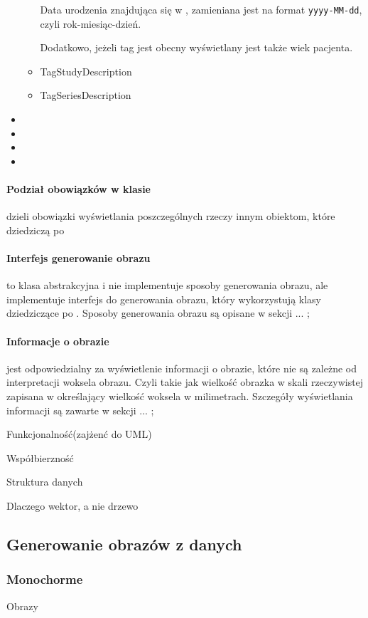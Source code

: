 \begin{itemize}
\begin{itemize}
        Data urodzenia znajdująca się w , zamieniana jest na format \texttt{yyyy-MM-dd}, czyli rok-miesiąc-dzień.

        Dodatkowo, jeżeli tag jest  obecny wyświetlany jest także wiek pacjenta.

        \item TagStudyDescription
        \item TagSeriesDescription
    \end{itemize}

    \item {}
    \item {}
    \item {}
    \item {}
\end{itemize}

\paragraph{Podział obowiązków w klasie}
 dzieli obowiązki wyświetlania poszczególnych rzeczy innym obiektom, które dziedziczą po \sokarclass

\paragraph{Interfejs generowanie obrazu}
 to klasa abstrakcyjna i nie implementuje sposoby generowania obrazu, ale implementuje interfejs do generowania obrazu, który wykorzystują klasy dziedziczące po .
Sposoby generowania obrazu są opisane w sekcji ... ;

\paragraph{Informacje o obrazie}
 jest odpowiedzialny za wyświetlenie informacji o obrazie, które nie są zależne od interpretacji woksela obrazu.
Czyli takie jak wielkość obrazka w skali rzeczywistej zapisana w  określający wielkość woksela w milimetrach.
Szczegóły wyświetlania informacji są zawarte w sekcji ... ;

Funkcjonalność(zajżenć do UML)

Współbierzność

Struktura danych

Dlaczego wektor, a nie drzewo

\subsection{Generowanie obrazów z danych}

\subsubsection{Monochorme}

Obrazy

